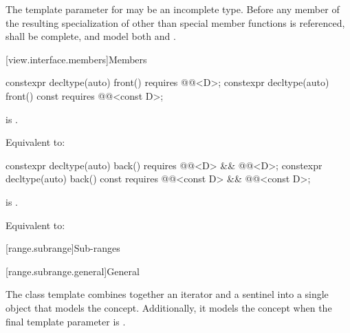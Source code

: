 \pnum
The template parameter  for  may be an
incomplete type. Before any member of the resulting specialization of
 other than special member functions
is referenced,  shall be complete, and
model both  and .

[view.interface.members]{Members}

%
\begin{itemdecl}
constexpr decltype(auto) front() requires @@<D>;
constexpr decltype(auto) front() const requires @@<const D>;
\end{itemdecl}

\begin{itemdescr}
\pnum
\expects
{} is .

\pnum
\effects
Equivalent to: 
\end{itemdescr}

%
\begin{itemdecl}
constexpr decltype(auto) back() requires @@<D> && @@<D>;
constexpr decltype(auto) back() const
  requires @@<const D> && @@<const D>;
\end{itemdecl}

\begin{itemdescr}
\pnum
\expects
{} is .

\pnum
\effects
Equivalent to: 
\end{itemdescr}

[range.subrange]{Sub-ranges}

[range.subrange.general]{General}

\pnum
The  class template combines together an
iterator and a sentinel into a single object that models the
 concept. Additionally, it models the
 concept when the final template parameter is
.

